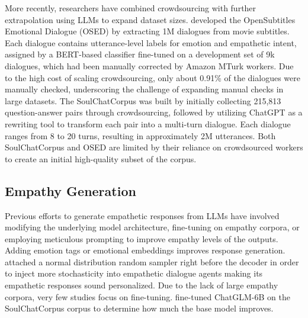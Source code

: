 More recently, researchers have combined crowdsourcing with further extrapolation using LLMs to expand dataset sizes.
\citet{welivita2020finegrained} developed the OpenSubtitles Emotional Dialogue (OSED) by extracting 1M dialogues from movie subtitles. Each dialogue contains utterance-level labels for emotion and empathetic intent, assigned by a BERT-based classifier fine-tuned on a development set of 9k dialogues, which had been manually corrected by Amazon MTurk workers. Due to the high cost of scaling crowdsourcing, only about 0.91\% of the dialogues were manually checked, underscoring the challenge of expanding manual checks in large datasets.
The SoulChatCorpus \cite{chen-etal-2023-soulchat} was built by initially collecting 215,813 question-answer pairs through crowdsourcing, followed by utilizing ChatGPT as a rewriting tool to transform each pair into a multi-turn dialogue. Each dialogue ranges from 8 to 20 turns, resulting in approximately 2M utterances. Both SoulChatCorpus and OSED are limited by their reliance on crowdsourced workers to create an initial high-quality subset of the corpus.

\subsection{Empathy Generation}

Previous efforts to generate empathetic responses from LLMs have involved modifying the underlying model architecture, fine-tuning on empathy corpora, or employing meticulous prompting to improve empathy levels of the outputs.
Adding emotion tags or emotional embeddings
\cite{rashkin-etal-2019-towards, goel2021emotion} improves response generation. 
\citet{lee2022improving} attached a normal distribution random sampler right before the decoder in order to inject more stochasticity into empathetic dialogue agents making its empathetic responses sound personalized. Due to the lack of large empathy corpora, very few studies focus on fine-tuning. \citet{chen-etal-2023-soulchat} fine-tuned ChatGLM-6B on the SoulChatCorpus corpus to determine how much the base model improves. 

